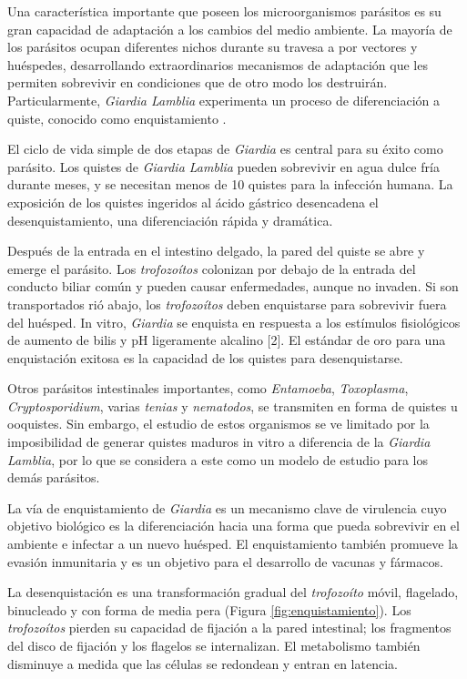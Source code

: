     Una característica importante que poseen los microorganismos parásitos es su gran capacidad de
    adaptación a los cambios del medio ambiente. La mayoría de los parásitos ocupan
    diferentes nichos durante su travesa a por vectores y huéspedes, desarrollando extraordinarios
    mecanismos de adaptación que les permiten sobrevivir en condiciones que de otro modo
    los destruirán. Particularmente, \textit{Giardia Lamblia} experimenta un proceso de diferenciación
    a quiste, conocido como enquistamiento \cite{gda}.

    El ciclo de vida simple de dos etapas de \textit{Giardia} es central para su éxito como parásito. Los
    quistes de \textit{Giardia Lamblia} pueden sobrevivir en agua dulce fría durante meses, y se necesitan
    menos de 10 quistes para la infección humana. La exposición de los quistes ingeridos al ácido
    gástrico desencadena el desenquistamiento, una diferenciación rápida y dramática.

    Después de la entrada en el intestino delgado, la pared del quiste se abre y emerge el
    parásito. Los \textit{trofozoítos} colonizan por debajo de la entrada del conducto biliar común y pueden
    causar enfermedades, aunque no invaden. Si son transportados rió abajo, los \textit{trofozoítos}
    deben enquistarse para sobrevivir fuera del huésped. In vitro, \textit{Giardia} se enquista en respuesta a
    los estímulos fisiológicos de aumento de bilis y pH ligeramente alcalino [2]. El estándar
    de oro para una enquistación exitosa es la capacidad de los quistes para desenquistarse.

    Otros parásitos intestinales importantes, como \textit{Entamoeba}, \textit{Toxoplasma}, \textit{Cryptosporidium}, varias
    \textit{tenias} y \textit{nematodos}, se transmiten en forma de quistes u ooquistes. Sin embargo,
    el estudio de estos organismos se ve limitado por la imposibilidad de generar quistes maduros
    in vitro a diferencia de la \textit{Giardia Lamblia}, por lo que se considera a este como un modelo
    de estudio para los demás parásitos.

    La vía de enquistamiento de \textit{Giardia} es un mecanismo clave de virulencia cuyo objetivo
    biológico es la diferenciación hacia una forma que pueda sobrevivir en el ambiente e infectar
    a un nuevo huésped. El enquistamiento también promueve la evasión inmunitaria y es un
    objetivo para el desarrollo de vacunas y fármacos.

    La desenquistación es una transformación gradual
    del \textit{trofozoíto} móvil, flagelado, binucleado y con forma de media pera (Figura \ref{fig:enquistamiento}).
    Los \textit{trofozoítos} pierden su capacidad de fijación a la pared intestinal; los fragmentos del disco de
    fijación y los flagelos se internalizan. El metabolismo también disminuye a medida que las células
    se redondean y entran en latencia.

